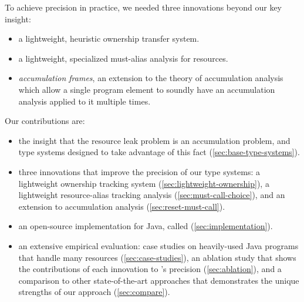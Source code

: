 To achieve precision in practice, we needed three
innovations beyond our key insight:
\begin{itemize}
\item a lightweight, heuristic ownership transfer system.
\item a lightweight, specialized must-alias analysis for resources.
\item \emph{accumulation frames}, an extension to the theory of
  accumulation analysis which allow a single program element to
  soundly have an accumulation analysis applied to it multiple times.
\end{itemize}

Our contributions are:
\begin{itemize}
\item the insight that the resource leak problem is an accumulation
  problem, and
  type systems designed to take advantage
  of this fact (\cref{sec:base-type-systems}).
\item three
  innovations that improve the precision of our type
  systems: a lightweight ownership tracking system
  (\cref{sec:lightweight-ownership}), a lightweight resource-alias
  tracking analysis (\cref{sec:must-call-choice}), and an extension to
  accumulation analysis (\cref{sec:reset-must-call}).
\item an open-source implementation for Java,
  called \Tool (\cref{sec:implementation}).
\item an extensive empirical evaluation: case studies on heavily-used
  Java programs that handle many resources (\cref{sec:case-studies}),
  an ablation study that shows the contributions of each innovation to
  \Tool's precision (\cref{sec:ablation}), and a comparison to
  other state-of-the-art approaches that demonstrates the unique strengths
  of our approach (\cref{sec:compare}).
\end{itemize}
  

